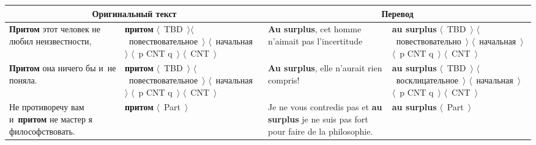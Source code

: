 \begin{multicols}{2}
\begin{table*}
\begin{center}
\begin{tabular}{|p{37mm}|p{37mm}|p{37mm}|p{37mm}|}
\hline
\multicolumn{2}{|c|}{Оригинальный текст} & \multicolumn{2}{c|}{Перевод}\\
\hline
\textbf{Притом} этот человек не любил неизвестности, &\textbf{притом}\newline 
$\langle$~TBD~$\rangle$\newline $\langle$~повествовательное~$\rangle$\newline 
$\langle$~начальная~$\rangle$\newline
$\langle$~p CNT q~$\rangle$\newline 
$\langle$~CNT~$\rangle$ 
&\textbf{Au surplus}, cet homme n'aimait pas l'incertitude &\textbf{au surplus} \newline
$\langle$~TBD~$\rangle$\newline
$\langle$~повествовательно~$\rangle$\newline 
$\langle$~начальная~$\rangle$\newline 
$\langle$~p CNT q~$\rangle$\newline
$\langle$~CNT~$\rangle$\\
\hline
\textbf{Притом} она ничего бы и~не поняла. &\textbf{притом}\newline 
$\langle$~TBD~$\rangle$\newline
$\langle$~повествовательное~$\rangle$\newline
$\langle$~начальная~$\rangle$\newline
                            $\langle$~p CNT q~$\rangle$\newline
$\langle$~CNT~$\rangle$ 
&\textbf{Au surplus}, elle n'aurait rien compris! &\textbf{au surplus}\newline 
$\langle$~TBD~$\rangle$\newline
$\langle$~восклицательное~$\rangle$\newline
$\langle$~начальная~$\rangle$\newline
$\langle$~p CNT q~$\rangle$\newline
$\langle$~CNT~$\rangle$\\
\hline
Не противоречу вам и~\textbf{притом} не мастер я философствовать. &\textbf{притом} 
$\langle$~Part~$\rangle$ 
&Je ne vous contredis pas et \textbf{au surplus} je ne suis pas fort pour faire de la philosophie. 
&\textbf{au surplus} \newline
$\langle$~Part~$\rangle$\\
\hline
\end{tabular}
\end{center}
\vspace*{-3pt}
\end{table*}


\end{multicols}
